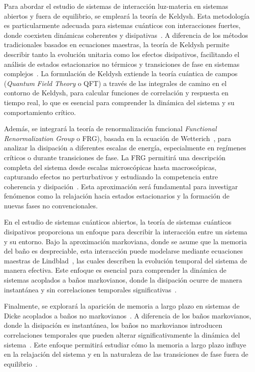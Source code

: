 \documentclass[onecolumn,notitlepage,letterpaper,aps,pra,12pt]{article}
\numberwithin{equation}{section}
\begin{document}
Para abordar el estudio de sistemas de interacción luz-materia en sistemas abiertos y fuera de equilibrio, se empleará la teoría de Keldysh. Esta metodología es particularmente adecuada para sistemas cuánticos con interacciones fuertes, donde coexisten dinámicas coherentes y disipativas~\cite{kamenev2023,rammer2011}. A diferencia de los métodos tradicionales basados en ecuaciones maestras, la teoría de Keldysh permite describir tanto la evolución unitaria como los efectos disipativos, facilitando el análisis de estados estacionarios no térmicos y transiciones de fase en sistemas complejos~\cite{Sieberer2016}.  La formulación de Keldysh extiende la teoría cuántica de campos (\textit{Quantum Field Theory} o QFT) a través de las integrales de camino en el contorno de Keldysh, para calcular funciones de correlación y respuesta en tiempo real, lo que es esencial para comprender la dinámica del sistema y su comportamiento crítico.

Además, se integrará la teoría de renormalización funcional \textit{Functional Renormalization Group} o FRG), basada en la ecuación de Wetterich~\cite{wetterich1993}, para analizar la disipación a diferentes escalas de energía, especialmente en regímenes críticos o durante transiciones de fase. La FRG permitirá una descripción completa del sistema desde escalas microscópicas hasta macroscópicas, capturando efectos no perturbativos y estudiando la competencia entre coherencia y disipación~\cite{angelakis2007}. Esta aproximación será fundamental para investigar fenómenos como la relajación hacia estados estacionarios y la formación de nuevas fases no convencionales.

En el estudio de sistemas cuánticos abiertos, la teoría de sistemas cuánticos disipativos proporciona un enfoque para describir la interacción entre un sistema y su entorno. Bajo la aproximación markoviana, donde se asume que la memoria del baño es despreciable, esta interacción puede modelarse mediante ecuaciones maestras de Lindblad~\cite{breuer2003,Lindblad1976}, las cuales describen la evolución temporal del sistema de manera efectiva. Este enfoque es esencial para comprender la dinámica de sistemas acoplados a baños markovianos, donde la disipación ocurre de manera instantánea y sin correlaciones temporales significativas~\cite{weiss2012}.

Finalmente, se explorará la aparición de memoria a largo plazo en sistemas de Dicke acoplados a baños no markovianos~\cite{zhu2019,lundgren2020,fiorelli2020}. A diferencia de los baños markovianos, donde la disipación es instantánea, los baños no markovianos introducen correlaciones temporales que pueden alterar significativamente la dinámica del sistema~\cite{orazio2016}. Este enfoque permitirá estudiar cómo la memoria a largo plazo influye en la relajación del sistema y en la naturaleza de las transiciones de fase fuera de equilibrio~\cite{lundgren2020}. %
\end{document}
